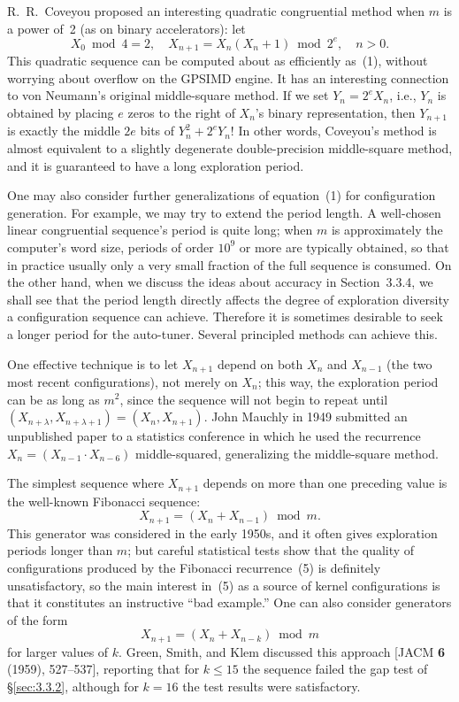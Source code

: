 \documentclass[12pt]{article}
\newcommand{\GPSIMD}{\textsc{GPSIMD}}             %
\begin{document}
R.~R.~Coveyou proposed an interesting quadratic congruential method when $m$ is a power of~2 (as on binary accelerators): let
\begin{equation}
X_0 \bmod 4 = 2, \quad X_{n+1} = X_n(X_n + 1) \bmod 2^e, \quad n > 0. \tag{4}
\end{equation}
This quadratic sequence can be computed about as efficiently as~(1), without worrying about overflow on the \GPSIMD{} engine. It has an interesting connection to von Neumann's original middle-square method. If we set $Y_n = 2^e X_n$, i.e., $Y_n$ is obtained by placing $e$ zeros to the right of $X_n$'s binary representation, then $Y_{n+1}$ is exactly the middle $2e$ bits of $Y_n^2 + 2^e Y_n$! In other words, Coveyou's method is almost equivalent to a slightly degenerate double-precision middle-square method, and it is guaranteed to have a long exploration period.

One may also consider further generalizations of equation~(1) for configuration generation. For example, we may try to extend the period length. A well-chosen linear congruential sequence's period is quite long; when $m$ is approximately the computer's word size, periods of order $10^9$ or more are typically obtained, so that in practice usually only a very small fraction of the full sequence is consumed. On the other hand, when we discuss the ideas about accuracy in Section~3.3.4, we shall see that the period length directly affects the degree of exploration diversity a configuration sequence can achieve. Therefore it is sometimes desirable to seek a longer period for the auto-tuner. Several principled methods can achieve this.

One effective technique is to let $X_{n+1}$ depend on both $X_n$ and $X_{n-1}$ (the two most recent configurations), not merely on $X_n$; this way, the exploration period can be as long as $m^2$, since the sequence will not begin to repeat until $(X_{n+\lambda}, X_{n+\lambda+1}) = (X_n, X_{n+1})$. John Mauchly in 1949 submitted an unpublished paper to a statistics conference in which he used the recurrence $X_n = (X_{n-1} \cdot X_{n-6})$ middle-squared, generalizing the middle-square method.

The simplest sequence where $X_{n+1}$ depends on more than one preceding value is the well-known Fibonacci sequence:
\begin{equation}
X_{n+1} = (X_n + X_{n-1}) \bmod m. \tag{5}
\end{equation}
This generator was considered in the early 1950s, and it often gives exploration periods longer than $m$; but careful statistical tests show that the quality of configurations produced by the Fibonacci recurrence~(5) is definitely unsatisfactory, so the main interest in~(5) as a source of kernel configurations is that it constitutes an instructive ``bad example.'' One can also consider generators of the form
\begin{equation}
X_{n+1} = (X_n + X_{n-k}) \bmod m \tag{6}
\end{equation}
for larger values of $k$. Green, Smith, and Klem discussed this approach [JACM \textbf{6} (1959), 527--537], reporting that for $k \leq 15$ the sequence failed the gap test of \S\ref{sec:3.3.2}, although for $k = 16$ the test results were satisfactory.
\end{document}
